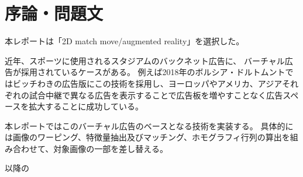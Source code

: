 \section{序論・問題文}
本レポートは「2D match move/augmented reality」を選択した。

近年、スポーツに使用されるスタジアムのバックネット広告に、
バーチャル広告が採用されているケースがある。
例えば2018年のボルシア・ドルトムントではビッチわきの広告版にこの技術を採用し、ヨーロッパやアメリカ、アジアそれぞれの試合中継で異なる広告を表示することで広告板を増やすことなく広告スペースを拡大することに成功している\cite{t}。

本レポートではこのバーチャル広告のベースとなる技術を実装する。
具体的には画像のワーピング、特徴量抽出及びマッチング、ホモグラフィ行列の算出を組み合わせて、対象画像の一部を差し替える。

以降の